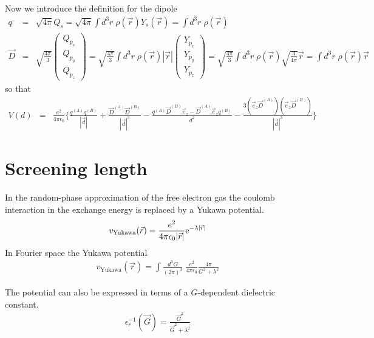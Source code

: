 \documentclass[11pt,a4paper]{report}
\begin{document}
Now we introduce the definition for the dipole
\begin{eqnarray*}
q&=&\sqrt{4\pi}Q_s=\sqrt{4\pi}\int d^3r\;\rho(\vec{r})Y_s(\vec{r})=\int d^3r\;\rho(\vec{r})
\\
\vec{D}&=&\sqrt{\frac{4\pi}{3}}\left(\begin{array}{c}Q_{p_x}\\Q_{p_y}\\Q_{p_z}\end{array}\right)
=\sqrt{\frac{4\pi}{3}}\int d^3r\;\rho(\vec{r})|\vec{r}|
\left(\begin{array}{c}Y_{p_x}\\Y_{p_y}\\Y_{p_z}\end{array}\right)
=\sqrt{\frac{4\pi}{3}}\int d^3r\;\rho(\vec{r})\sqrt{\frac{3}{4\pi}}\vec{r}
=\int d^3r\;\rho(\vec{r})\vec{r}
\end{eqnarray*}
so that
\begin{eqnarray*}
V(d)&=&
\frac{e^2}{4\pi\epsilon_0}\biggl\lbrace 
\frac{ q^{(A)}q^{(B)}}{|\vec{d}|}+\frac{\vec{D}^{(A)}\vec{D}^{(B)}}{|\vec{d}|^3}
-\frac{q^{(A)}\vec{D}^{(B)}\vec{e}_z-\vec{D}^{(A)}\vec{e}_zq^{(B)}}{d^2}
-\frac{ 3(\vec{e}_z\vec{D}^{(A)})(\vec{e}_z\vec{D}^{(B)})}{|\vec{d}|^3}
\biggr\rbrace
\end{eqnarray*}



\chapter{Screening length}
In the random-phase approximation of the free electron gas the coulomb
interaction in the exchange energy is replaced by a Yukawa potential.
\begin{eqnarray}
v_{\text{Yukawa}}(\vec{r})
=\frac{e^2}{4\pi\epsilon_0|\vec{r}|}
\mathrm{e}^{-\lambda|\vec{r}|}
\end{eqnarray}
In Fourier space the Yukawa potential 
\begin{eqnarray}
v_{\text{Yukawa}}(\vec{r})=\int \frac{d^3G}{(2\pi)^3}\;
  \frac{e^2}{4\pi\epsilon_0}\frac{4\pi}{G^2+\lambda^2}
\end{eqnarray}

The potential can also be expressed in terms of a $G$-dependent
dielectric constant.
\begin{eqnarray}
\epsilon_r^{-1}(\vec{G})=\frac{\vec{G}^2}{\vec{G}^2+\lambda^2}
\end{eqnarray}
\end{document}
